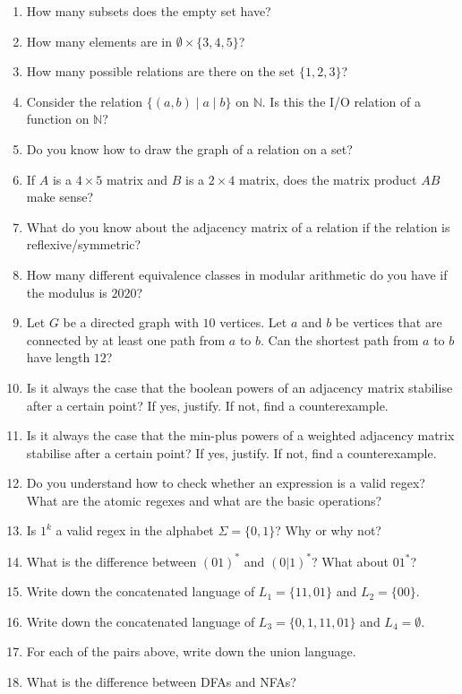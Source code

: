 \documentclass{amsart}
\begin{document}
\begin{enumerate}
\item How many subsets does the empty set have?
\item How many elements are in \(\emptyset \times \{3,4,5\}\)?
\item How many possible relations are there on the set \(\{1,2,3\}\)?
\item Consider the relation \(\{(a,b) \mid a \mid b\}\) on \(\mathbb{N}\). Is this the I/O relation of a function on \(\mathbb{N}\)?
\item Do you know how to draw the graph of a relation on a set?
\item If \(A\) is a \(4 \times 5\) matrix and \(B\) is a \(2 \times 4\) matrix, does the matrix product \(AB\) make sense?
\item What do you know about the adjacency matrix of a relation if the relation is reflexive/symmetric?
\item How many different equivalence classes in modular arithmetic do you have if the modulus is \(2020\)?
\item Let \(G\) be a directed graph with \(10\) vertices. Let \(a\) and \(b\) be vertices that are connected by at least one path from \(a\) to \(b\). Can the shortest path from \(a\) to \(b\) have length \(12\)?
\item Is it always the case that the boolean powers of an adjacency matrix stabilise after a certain point? If yes, justify. If not, find a counterexample.
\item Is it always the case that the min-plus powers of a weighted adjacency matrix stabilise after a certain point? If yes, justify. If not, find a counterexample.
\item Do you understand how to check whether an expression is a valid regex? What are the atomic regexes and what are the basic operations?
\item Is \(1^{k}\) a valid regex in the alphabet \(\Sigma = \{0,1\}\)? Why or why not?
\item What is the difference between \((01)^{\ast}\) and \((0|1)^{\ast}\)? What about \(01^{\ast}\)?
\item Write down the concatenated language of \(L_1 = \{11,01\}\) and \(L_2 = \{00\}\).
\item Write down the concatenated language of \(L_3 = \{0,1,11,01\}\) and \(L_4 = \emptyset\).
\item For each of the pairs above, write down the union language.
\item What is the difference between DFAs and NFAs?

\end{enumerate}
\end{document}
